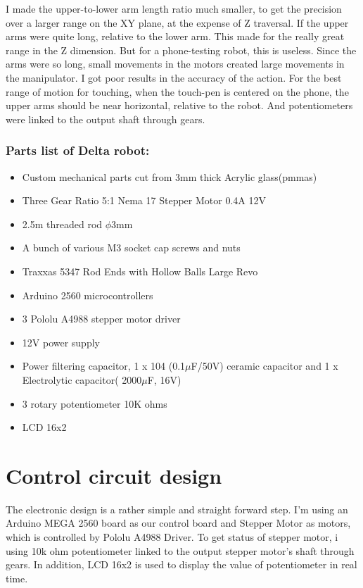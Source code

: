 I made the upper-to-lower arm length ratio much smaller, to get the precision over a larger range on the XY plane, at the expense of Z traversal. If the upper arms were quite long, relative to the lower arm. This made for the really great range in the Z dimension. But for a phone-testing robot, this is useless. Since the arms were so long, small movements in the motors created large movements in the manipulator. I got poor results in the accuracy of the action. For the best range of motion for touching, when the touch-pen is centered on the phone, the upper arms should be near horizontal, relative to the robot.
And potentiometers were linked to the output shaft through gears.

\subsubsection{Parts list of Delta robot:}
\begin{itemize}
		\item Custom mechanical parts cut from 3mm thick Acrylic glass(\glspl{pmma})
		\item Three Gear Ratio 5:1 Nema 17 Stepper Motor 0.4A 12V
		\item 2.5m threaded rod $\phi$3mm
		\item A bunch of various M3 socket cap screws and nuts
		\item Traxxas 5347 Rod Ends with Hollow Balls Large Revo\cite{traxxas_5347_thesis}
		\item Arduino 2560 microcontrollers
		\item 3 Pololu A4988 stepper motor driver
		\item 12V power supply
		\item Power filtering capacitor, 1 x 104 (0.1$\mu$F/50V) ceramic capacitor and 1 x Electrolytic capacitor( 2000$\mu$F, 16V)
		\item 3 rotary potentiometer 10K ohms
		\item LCD 16x2
\end{itemize}


\section{Control circuit design}
The electronic design is a rather simple and straight forward step. I'm using an Arduino MEGA 2560 board as our control board and Stepper Motor as motors, which is controlled by Pololu A4988 Driver. To get status of stepper motor, i using 10k ohm potentiometer linked to the output stepper motor's shaft through gears. In addition, LCD 16x2 is used to display the value of potentiometer in real time.

